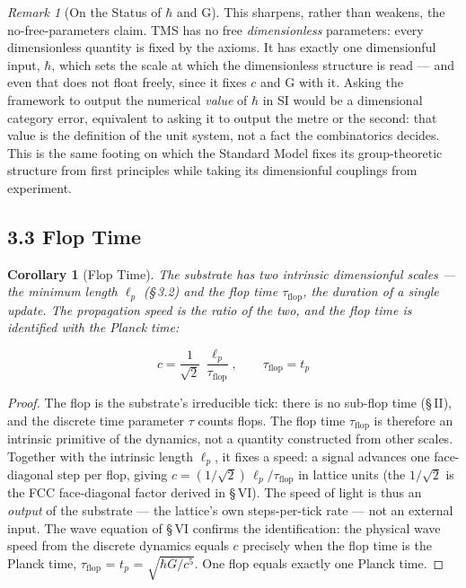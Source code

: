 \documentclass[11pt,oneside]{report}
\newtheorem{corollary}[theorem]{Corollary}
\theoremstyle{definition}
\theoremstyle{remark}
\newtheorem{remark}[theorem]{Remark}
\begin{document}
\begin{remark}[On the Status of \ensuremath{\hbar} and G]
This sharpens, rather than weakens, the no-free-parameters claim. TMS has no free
\emph{dimensionless} parameters: every dimensionless quantity is fixed by the
axioms. It has exactly one dimensionful input, \ensuremath{\hbar}, which sets the scale at
which the dimensionless structure is read --- and even that does not float freely,
since it fixes \ensuremath{c} and G with it. Asking the framework to output the numerical
\emph{value} of \ensuremath{\hbar} in SI would be a dimensional category error, equivalent to
asking it to output the metre or the second: that value is the definition of the
unit system, not a fact the combinatorics decides. This is the same footing on
which the Standard Model fixes its group-theoretic structure from first principles
while taking its dimensionful couplings from experiment.
\end{remark}

\subsection*{3.3 Flop Time}

\begin{corollary}[Flop Time]
The substrate has two intrinsic dimensionful scales --- the minimum length
\ensuremath{\ell_{p}} (\S\,3.2) and the flop time \ensuremath{\tau_{\mathrm{flop}}}, the duration of a single
update. The propagation speed is the ratio of the two, and the flop time is
identified with the Planck time:
\end{corollary}

\begin{equation*}
c = \frac{1}{\sqrt{2}}\,\frac{\ell_{p}}{\tau_{\mathrm{flop}}}, \qquad
\tau_{\mathrm{flop}} = t_{p}
\end{equation*}

\begin{proof}
The flop is the substrate's irreducible tick: there is no sub-flop time
(\S\,II), and the discrete time parameter \ensuremath{\tau} counts flops. The flop time
\ensuremath{\tau_{\mathrm{flop}}} is therefore an intrinsic primitive of the dynamics, not a
quantity constructed from other scales. Together with the intrinsic length
\ensuremath{\ell_{p}}, it fixes a speed: a signal advances one face-diagonal step per flop,
giving \ensuremath{c = (1/\sqrt{2})\,\ell_{p}/\tau_{\mathrm{flop}}} in lattice units (the
\ensuremath{1/\sqrt{2}} is the FCC face-diagonal factor derived in \S\,VI). The speed of
light is thus an \emph{output} of the substrate --- the lattice's own
steps-per-tick rate --- not an external input. The wave equation of \S\,VI
confirms the identification: the physical wave speed from the discrete dynamics
equals \ensuremath{c} precisely when the flop time is the Planck time, \ensuremath{\tau_{\mathrm{flop}}}
= \ensuremath{t_{p}} = \ensuremath{\sqrt{\hbar G/c^{5}}}. One flop equals exactly one Planck time.
\end{proof}
\end{document}
